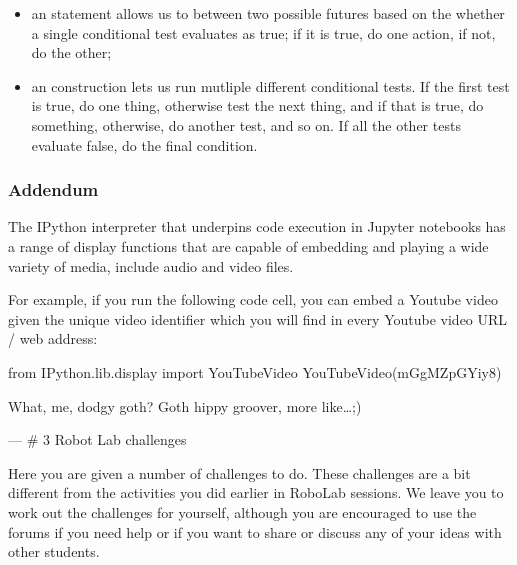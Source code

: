 \documentclass[letterpaper,10pt,english]{sphinxmanual}
\begin{document}
{\begin{itemize}
\item {} 
an  statement allows us to  between two possible futures based on the whether a single conditional test evaluates as true; if it is true, do one action, if not, do the other;

\item {} 
an  construction lets us run mutliple different conditional tests. If the first test is true, do one thing, otherwise test the next thing, and if that is true, do something, otherwise, do another test, and so on. If all the other  tests evaluate false, do the final  condition.

\end{itemize}


\subsubsection{Addendum}
\label{\detokenize{content/02_Robot_Lab/Section_00_02:Addendum}}
The IPython interpreter that underpins code execution in Jupyter notebooks has a range of display functions that are capable of embedding and playing a wide variety of media, include audio and video files.

For example, if you run the following code cell, you can embed a Youtube video given the unique video identifier which you will find in every Youtube video URL / web address:

{
\begin{sphinxVerbatim}[commandchars=\\\{\}]
\llap{\color{nbsphinxin}[ ]:\,\hspace{\fboxrule}\hspace{\fboxsep}}from IPython.lib.display import YouTubeVideo
YouTubeVideo(\PYGZsq{}mGgMZpGYiy8\PYGZsq{})
\end{sphinxVerbatim}
}

What, me, dodgy goth? Goth hippy groover, more like…;\sphinxhyphen{})



---
# 3 Robot Lab challenges


Here you are given a number of challenges to do. These challenges are a bit different from the activities you did earlier in RoboLab sessions. We leave you to work out the challenges for yourself, although you are encouraged to use the forums if you need help or if you want to share or discuss any of your ideas with other students.

}
\end{document}
